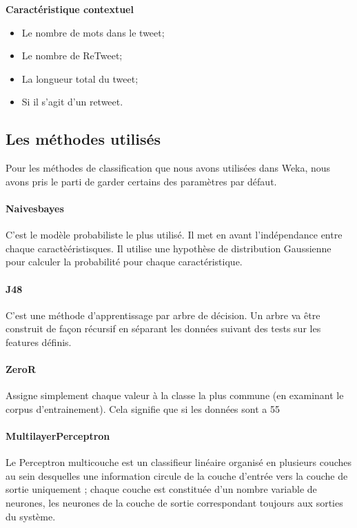 \documentclass[10pt,a4paper,twoside]{article}
\begin{document}
\textbf{Caractéristique contextuel}
\begin{itemize}
\item Le nombre de mots dans le tweet;
\item Le nombre de ReTweet;
\item La longueur total du tweet;
\item Si il s'agit d'un retweet.
\end{itemize}
\vspace{0.5cm}

\subsection{Les méthodes utilisés}
\label{methode}
Pour les méthodes de classification que nous avons utilisées dans Weka, nous avons pris le parti de garder certains des paramètres par défaut. 
\paragraph{Naivesbayes} C'est le modèle probabiliste le plus utilisé. Il met en avant l'indépendance entre chaque caractèéristisques. Il utilise une hypothèse de distribution Gaussienne pour calculer la probabilité pour chaque caractéristique.
\paragraph{J48} C'est une méthode d'apprentissage par arbre de décision. Un arbre va être construit de façon récursif en séparant les données suivant des tests sur les features définis. 
\paragraph{ZeroR} Assigne simplement chaque valeur à la classe la plus commune (en examinant le corpus d'entrainement). Cela signifie que si les données sont a 55%
\paragraph{MultilayerPerceptron} Le Perceptron multicouche est un classifieur linéaire organisé en plusieurs couches au sein desquelles une information circule de la couche d'entrée vers la couche de sortie uniquement ; chaque couche est constituée d'un nombre variable de neurones, les neurones de la couche de sortie correspondant toujours aux sorties du système.
\end{document}
